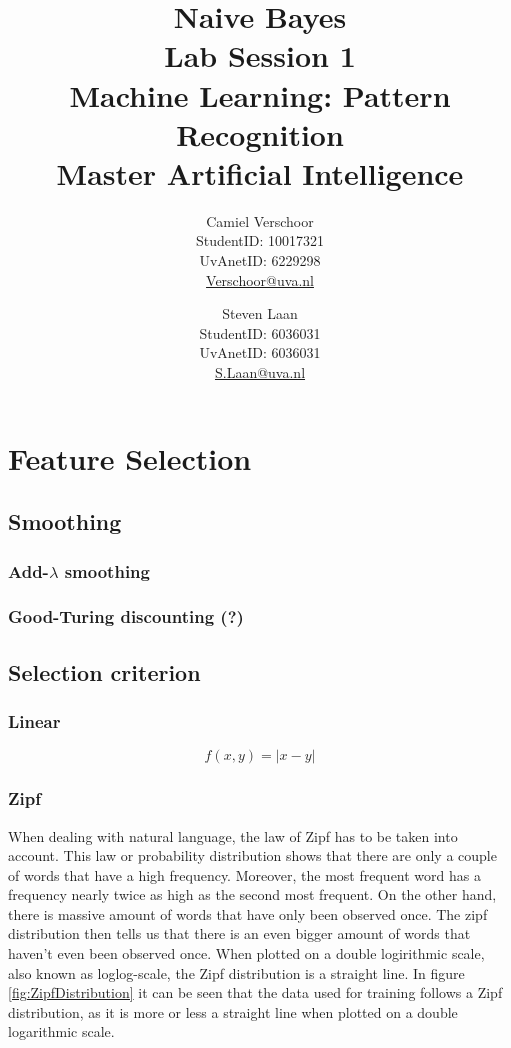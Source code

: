 \documentclass[a4paper]{article}
\title{Naive Bayes\\\large Lab Session 1\\Machine Learning: Pattern Recognition\\Master Artificial Intelligence}
\author{Camiel Verschoor \\StudentID: 10017321\\UvAnetID: 6229298\\ \url{Verschoor@uva.nl} \and Steven Laan\\StudentID: 6036031\\UvAnetID: 6036031\\\url{S.Laan@uva.nl}}
\begin{document}
\maketitle

\section{Feature Selection}

\subsection{Smoothing}
\subsubsection{Add-$\lambda$ smoothing}

\subsubsection{Good-Turing discounting (?)}


\subsection{Selection criterion}
\subsubsection{Linear}
$$f(x,y) = |x-y|$$

\subsubsection{Zipf}
When dealing with natural language, the law of Zipf has to be taken into account. This law or probability distribution shows that there are only a couple of words that have a high frequency. Moreover, the most frequent word has a frequency nearly twice as high as the second most frequent. On the other hand, there is massive amount of words that have only been observed once. The zipf distribution then tells us that there is an even bigger amount of words that haven't even been observed once. 
When plotted on a double logirithmic scale, also known as loglog-scale, the Zipf distribution is a straight line. In figure \ref{fig:ZipfDistribution} it can be seen that the data used for training follows a Zipf distribution, as it is more or less a straight line when plotted on a double logarithmic scale.
\end{document}
